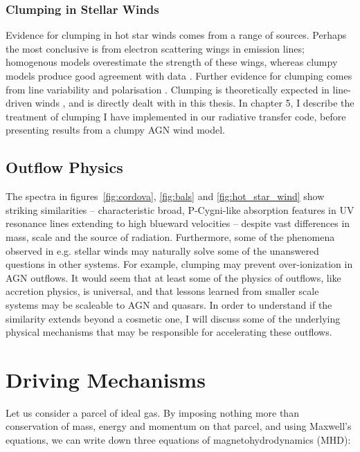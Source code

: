 \subsubsection{Clumping in Stellar Winds}

\label{sec:clumpy_stellar}

Evidence for clumping in hot star winds comes from a range of sources.
Perhaps the most conclusive is from electron scattering wings
in emission lines; homogenous models overestimate the strength of these
wings, whereas clumpy models produce good agreement with data 
\citep{hillier1984,hillier1991eswingsmodel,hamann1992wr,hamann1994,schmutz1997}.
Further evidence for clumping comes from line variability \citep{prinja1992}
and polarisation \citep{brown1995}. Clumping is theoretically expected
in line-driven winds 
\citep[see section~\ref{sec:line_driving} and the review by][]{owocki2014}, 
and is directly dealt with in this thesis.
In chapter 5, I describe the treatment of clumping I have implemented 
in our radiative transfer code, before presenting
results from a clumpy AGN wind model.

\subsection{Outflow Physics}

The spectra in figures~\ref{fig:cordova}, \ref{fig:bals}
and \ref{fig:hot_star_wind} show striking similarities -- 
characteristic broad, P-Cygni-like absorption features in UV resonance
lines extending to high blueward velocities -- 
despite vast differences in mass, scale and the source of radiation. 
Furthermore, some of the phenomena observed in e.g. stellar winds may 
naturally solve some of 
the unanswered questions in other systems. For example, clumping
may prevent over-ionization in AGN outflows. It would seem
that at least some of the physics of outflows, like accretion physics,
is universal, and that lessons learned from smaller scale systems may be
scaleable to AGN and quasars. In order to understand if the similarity extends beyond
a cosmetic one, I will discuss some of the 
underlying physical mechanisms that may be responsible for accelerating
these outflows.

\section{Driving Mechanisms}

Let us consider a parcel of ideal gas. By imposing nothing more than
conservation of mass, energy and momentum on that parcel, and using 
Maxwell's equations, we can write down 
three equations of magnetohydrodynamics (MHD):

